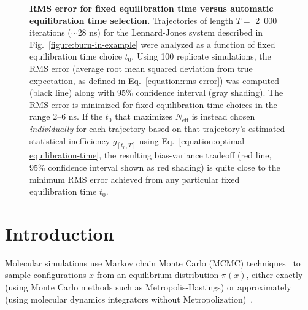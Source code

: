 \documentclass[aps,pre,twocolumn,nofootinbib,superscriptaddress,linenumbers,11point]{revtex4-1}
\begin{document}

\begin{figure}[tbp]
\caption{\label{figure:bias-variance} {\bf RMS error for fixed equilibration time versus automatic equilibration time selection.} 
Trajectories of length $T = $ 2~000 iterations ($\sim$28 ns) for the Lennard-Jones system described in Fig.~\ref{figure:burn-in-example} were analyzed as a function of fixed equilibration time choice $t_0$.
Using 100 replicate simulations, the RMS error (average root mean squared deviation from true expectation, as defined in Eq.~\ref{equation:rms-error}) was computed (black line) along with 95\% confidence interval (gray shading).
The RMS error is minimized for fixed equilibration time choices in the range 2--6 ns.
If the $t_0$ that maximizes $N_\mathrm{eff}$ is instead chosen \emph{individually} for each trajectory based on that trajectory's estimated statistical inefficiency $g_{[t_0,T]}$ using Eq.~\ref{equation:optimal-equilibration-time}, the resulting bias-variance tradeoff (red line, 95\% confidence interval shown as red shading) is quite close to the minimum RMS error achieved from any particular fixed equilibration time $t_0$.
}
\end{figure}


\section*{Introduction}
\label{section:introduction}

Molecular simulations use Markov chain Monte Carlo (MCMC) techniques~\cite{jun-s-liu:mcmc} to sample configurations $x$ from an equilibrium distribution $\pi(x)$, either exactly (using Monte Carlo methods such as Metropolis-Hastings) or approximately (using molecular dynamics integrators without Metropolization)~\cite{sivak:2013:prx:vvvr}.
\end{document}
